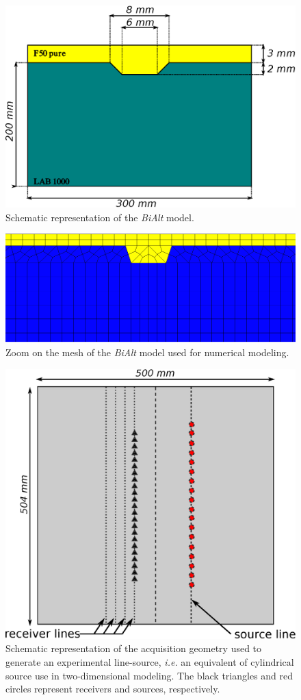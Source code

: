 \documentclass[paper,extra]{gji} %
\newcommand{\bialt}{\textit{BiAlt} }
\begin{document}
\begin{figure}[!h]
\centering
\includegraphics[width=0.75\columnwidth]{fig/bialt_model.eps}
\caption{Schematic representation of the \bialt model.}
\label{panel_bialt_model}
\end{figure}

\begin{figure}[!h]
\centering
\includegraphics[width=0.75\columnwidth]{fig/bialt-mesh.eps}
\caption{Zoom on the mesh of the \bialt model used for numerical modeling.}
\label{panel_bialt_mesh}
\end{figure}

\begin{figure}[!h]
\centering
\includegraphics[width=0.75\columnwidth]{fig/amplitude_acqui_principle.eps}
\caption{Schematic representation of the acquisition geometry used to generate an experimental line-source, \textit{i.e.} an equivalent of cylindrical source use in two-dimensional modeling. The black triangles and red circles represent receivers and sources, respectively.}
\label{amplitude_acqui_principle}
\end{figure}
\end{document}

